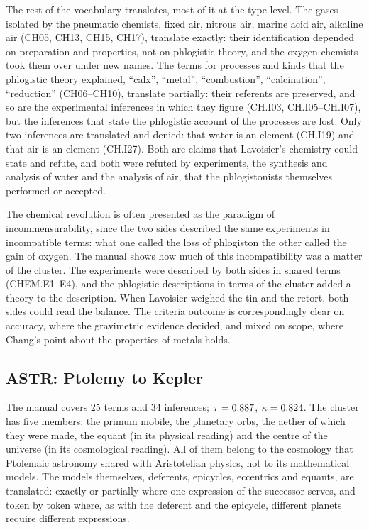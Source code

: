\documentclass{situationist-preprint}
\begin{document}
The rest of the vocabulary translates, most of it at the type level. The gases isolated by the pneumatic chemists, fixed air, nitrous air, marine acid air, alkaline air (CH05, CH13, CH15, CH17), translate exactly: their identification depended on preparation and properties, not on phlogistic theory, and the oxygen chemists took them over under new names. The terms for processes and kinds that the phlogistic theory explained, \enquote{calx}, \enquote{metal}, \enquote{combustion}, \enquote{calcination}, \enquote{reduction} (CH06--CH10), translate partially: their referents are preserved, and so are the experimental inferences in which they figure (CH.I03, CH.I05--CH.I07), but the inferences that state the phlogistic account of the processes are lost. Only two inferences are translated and denied: that water is an element (CH.I19) and that air is an element (CH.I27). Both are claims that Lavoisier's chemistry could state and refute, and both were refuted by experiments, the synthesis and analysis of water and the analysis of air, that the phlogistonists themselves performed or accepted.

The chemical revolution is often presented as the paradigm of incommensurability, since the two sides described the same experiments in incompatible terms: what one called the loss of phlogiston the other called the gain of oxygen. The manual shows how much of this incompatibility was a matter of the cluster. The experiments were described by both sides in shared terms (CHEM.E1--E4), and the phlogistic descriptions in terms of the cluster added a theory to the description. When Lavoisier weighed the tin and the retort, both sides could read the balance. The criteria outcome is correspondingly clear on accuracy, where the gravimetric evidence decided, and mixed on scope, where Chang's point about the properties of metals holds.

\subsection{ASTR: Ptolemy to Kepler}

The manual covers 25 terms and 34 inferences; $\tau = 0.887$, $\kappa = 0.824$. The cluster has five members: the primum mobile, the planetary orbs, the aether of which they were made, the equant (in its physical reading) and the centre of the universe (in its cosmological reading). All of them belong to the cosmology that Ptolemaic astronomy shared with Aristotelian physics, not to its mathematical models. The models themselves, deferents, epicycles, eccentrics and equants, are translated: exactly or partially where one expression of the successor serves, and token by token where, as with the deferent and the epicycle, different planets require different expressions.
\end{document}
